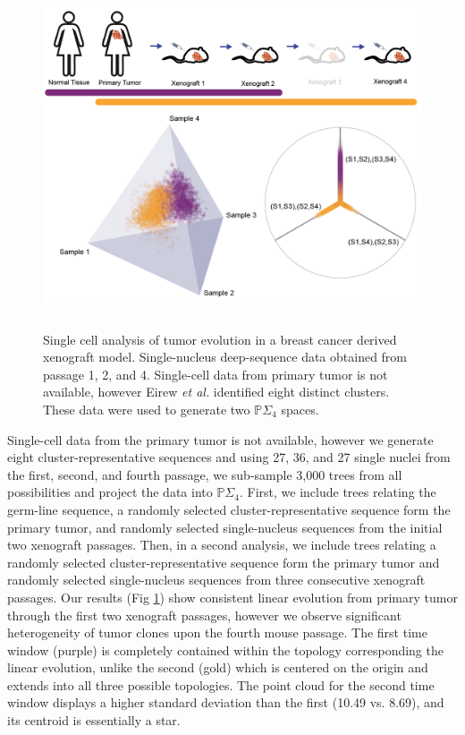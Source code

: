 \documentclass[a4paper,11pt]{article}
\begin{document}
\begin{figure}
    \centering
    \includegraphics[height=4in]{../figures/xenograft_single_cell.png}
    \caption{Single cell analysis of tumor evolution in a breast cancer derived xenograft model. Single-nucleus deep-sequence data obtained from passage 1, 2, and 4. Single-cell data from primary tumor is not available, however Eirew \textit{et al.} identified eight distinct clusters. These data were used to generate two $\mathbb{P}\Sigma_4 $ spaces.}
    \label{fig:xenograft}
\end{figure} 

Single-cell data from the primary tumor is not available, however we generate eight cluster-representative sequences and using 27, 36, and 27 single nuclei from the first, second, and fourth passage, we sub-sample 3,000 trees from all possibilities and project the data into $\mathbb{P}\Sigma_4 $.
First, we include trees relating the germ-line sequence, a randomly selected cluster-representative sequence form the primary tumor, and randomly selected single-nucleus sequences from the initial two xenograft passages.
Then, in a second analysis, we include trees relating a randomly selected cluster-representative sequence form the primary tumor and randomly selected single-nucleus sequences from three consecutive xenograft passages.
Our results (Fig \ref{fig:xenograft}) show consistent linear evolution from primary tumor through the first two xenograft passages, however we observe significant heterogeneity of tumor clones upon the fourth mouse passage.
The first time window (purple) is completely contained within the topology corresponding the linear evolution, unlike the second (gold) which is centered on the origin and extends into all three possible topologies.
The point cloud for the second time window displays a higher standard deviation than the first (10.49 vs. 8.69), and its centroid is essentially a star. 
\end{document}
